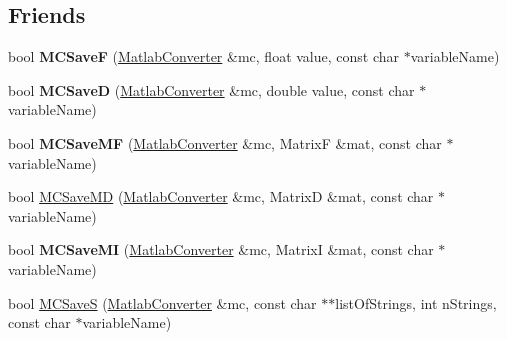 \subsection*{Friends}
\begin{DoxyCompactItemize}
\item 
\hypertarget{classMatlabConverter_a0bbc5f54e71e79c28941ea3bf59472ff}{
bool {\bfseries MCSaveF} (\hyperlink{classMatlabConverter}{MatlabConverter} \&mc, float value, const char $\ast$variableName)}
\label{classMatlabConverter_a0bbc5f54e71e79c28941ea3bf59472ff}

\item 
\hypertarget{classMatlabConverter_a47bf295200d42fd7f28923fd6e1acaa3}{
bool {\bfseries MCSaveD} (\hyperlink{classMatlabConverter}{MatlabConverter} \&mc, double value, const char $\ast$variableName)}
\label{classMatlabConverter_a47bf295200d42fd7f28923fd6e1acaa3}

\item 
\hypertarget{classMatlabConverter_aa8c8d361346d6aa95488c2582d3a9c20}{
bool {\bfseries MCSaveMF} (\hyperlink{classMatlabConverter}{MatlabConverter} \&mc, MatrixF \&mat, const char $\ast$variableName)}
\label{classMatlabConverter_aa8c8d361346d6aa95488c2582d3a9c20}

\item 
bool \hyperlink{classMatlabConverter_a10f6a83594f4db66392e6f5f3661e570}{MCSaveMD} (\hyperlink{classMatlabConverter}{MatlabConverter} \&mc, MatrixD \&mat, const char $\ast$variableName)
\item 
\hypertarget{classMatlabConverter_a7aaec595471ddd504f18d7fbc57d1d99}{
bool {\bfseries MCSaveMI} (\hyperlink{classMatlabConverter}{MatlabConverter} \&mc, MatrixI \&mat, const char $\ast$variableName)}
\label{classMatlabConverter_a7aaec595471ddd504f18d7fbc57d1d99}

\item 
bool \hyperlink{classMatlabConverter_a885c79a3a662eef92348655319e90e47}{MCSaveS} (\hyperlink{classMatlabConverter}{MatlabConverter} \&mc, const char $\ast$$\ast$listOfStrings, int nStrings, const char $\ast$variableName)
\end{DoxyCompactItemize}


